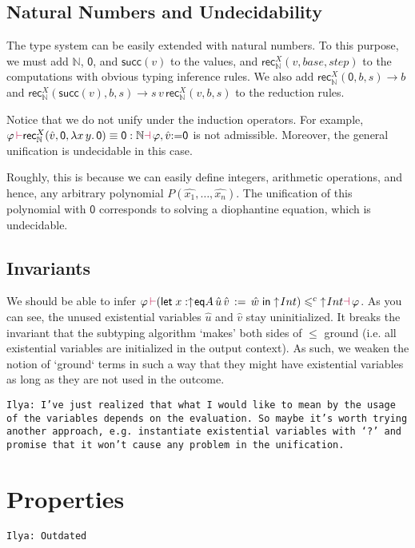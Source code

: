 \documentclass[a4,natbib=false]{article}
\newcommand{\ilyam}[1]{{\color{red} \texttt{Ilya:  #1}}}
\newcommand{\fun}[2]{\lambda {#1}.\,{#2}}
\newcommand{\letval}[3]{\mathsf{let}\; {#1} \,:=\, {#2} \;\mathsf{in}\; {#3}}
\newcommand{\valtocomp}[1]{\uparrow \hspace{-2pt} #1}
\newcommand{\eqtype}[3]{\mathsf{eq}{#1}\,{#2}\,{#3}}
\newcommand{\csubt}{\leqslant^c}
\newcommand{\evarassign}[2]{{#1} \mathsf{:=} {#2}}
\newcommand{\reduces}[2]{{#1} \rightarrow {#2}}
\newcommand{\nattype}{\mathbb{N}}
\newcommand{\natzero}{\mathsf{0}}
\newcommand{\natsucc}[1]{\mathsf{succ}({#1})}
\newcommand{\recnat}[4]{\mathsf{rec}_{\nattype}^{#2}({#1},{#3},{#4})}
\newcommand{\judgeacsubt}[4]{{#1}\,{\color{purple}\vdash} {#2} \csubt {#3} {\color{purple}\dashv}\,{#4}}
\newcommand{\judgeaequiv}[5]{{#1}\,{\color{purple}\vdash} {#2} \equiv {#3} : {#4}{\color{purple}\dashv}\,{#5}}
\begin{document}
\subsection{Natural Numbers and Undecidability}

The type system can be easily extended with natural numbers. To this purpose, we
must add $\nattype$, $\natzero$, and $\natsucc{v}$ to the values, and
$\recnat{v}{X}{base}{step}$ to the computations with obvious typing inference
rules.
We also add $\reduces{\recnat{\natzero}{X}{b}{s}}{b}$ and
$\reduces{\recnat{\natsucc{v}}{X}{b}{s}}{s \, v \, \recnat{v}{X}{b}{s}}$ to the reduction rules.

Notice that we do not unify under the induction operators. For example,
$\judgeaequiv{\varphi}{\recnat{\hat{v}}{X}{\natzero}{\fun{x\,y}{\natzero}}}{\natzero}{\nattype}{\varphi, \evarassign{\hat{v}}{\natzero}}$
is not admissible.
Moreover, the general unification is undecidable in this case.

Roughly, this is because we can easily define integers,
arithmetic operations, and hence, any arbitrary polynomial
$P(\hat{x_1}, \dots, \hat{x_n})$.
The unification of this polynomial with $\natzero$
corresponds to solving a diophantine equation, which is undecidable.

\subsection{Invariants}

We should be able to infer
$\judgeacsubt{\varphi}{(\letval{x:\valtocomp{\eqtype{A}{\hat{u}}{\hat{v}}}}{\hat{w}}{\valtocomp{Int}})}{\valtocomp{Int}}{\varphi}$.
As you can see, the unused existential variables $\hat{u}$ and $\hat{v}$ stay uninitialized.
It breaks the invariant that the subtyping algorithm `makes' both sides of $\leqslant$ ground (i.e. all existential variables are initialized in the output context).
As such, we weaken the notion of `ground` terms in such a way that they might have existential variables as long as they are not used in the outcome.

\ilyam{I've just realized that what I would like to mean by the usage of the variables depends on the evaluation. So maybe it's worth trying another approach,
  e.g. instantiate existential variables with `?' and promise that it won't cause any problem in the unification. }


\section{Properties}
\ilyam{Outdated}
\end{document}
